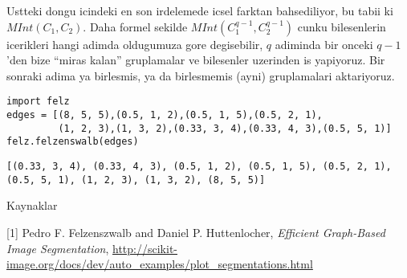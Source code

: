 \documentclass[12pt,fleqn]{article}\usepackage{../common}
\begin{document}
Ustteki dongu icindeki en son irdelemede icsel farktan bahsediliyor, bu
tabii ki $MInt(C_1,C_2)$. Daha formel sekilde $MInt(C_1^{q-1},C_2^{q-1})$
cunku bilesenlerin icerikleri hangi adimda oldugumuza gore degisebilir, $q$
adiminda bir onceki $q-1$'den bize ``miras kalan'' gruplamalar ve
bilesenler uzerinden is yapiyoruz. Bir sonraki adima ya birlesmis, ya da
birlesmemis (ayni) gruplamalari aktariyoruz. 

\begin{verbatim}
import felz
edges = [(8, 5, 5),(0.5, 1, 2),(0.5, 1, 5),(0.5, 2, 1),
         (1, 2, 3),(1, 3, 2),(0.33, 3, 4),(0.33, 4, 3),(0.5, 5, 1)]
felz.felzenswalb(edges)
\end{verbatim}

\begin{verbatim}
[(0.33, 3, 4), (0.33, 4, 3), (0.5, 1, 2), (0.5, 1, 5), (0.5, 2, 1), (0.5, 5, 1), (1, 2, 3), (1, 3, 2), (8, 5, 5)]
\end{verbatim}









Kaynaklar

[1] Pedro F. Felzenszwalb and Daniel P. Huttenlocher, {\em Efficient
  Graph-Based Image Segmentation},
\url{http://scikit-image.org/docs/dev/auto_examples/plot_segmentations.html}
\end{document}
